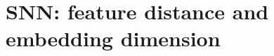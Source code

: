 
\section{SNN: feature distance and embedding dimension}\label{apx:siamese:feature-distance-and-embedding-dimension}



